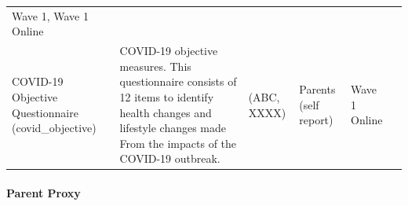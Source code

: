 \documentclass[]{book}
\let\oldparagraph\paragraph
\renewcommand{\paragraph}[1]{\oldparagraph{#1}\mbox{}}
\begin{document}
\begin{longtable}[]{@{}llllll@{}}
\begin{minipage}[t]{0.06\columnwidth}
Wave 1, Wave 1 Online\strut
\end{minipage} & \begin{minipage}[t]{0.10\columnwidth}\raggedright
\strut
\end{minipage}\tabularnewline
\begin{minipage}[t]{0.18\columnwidth}\raggedright
COVID-19 Objective Questionnaire (covid\_objective)\strut
\end{minipage} & \begin{minipage}[t]{0.18\columnwidth}\raggedright
COVID-19 objective measures. This questionnaire consists of 12 items to identify health changes and lifestyle changes made From the impacts of the COVID-19 outbreak.\strut
\end{minipage} & \begin{minipage}[t]{0.15\columnwidth}\raggedright
(ABC, XXXX)\strut
\end{minipage} & \begin{minipage}[t]{0.16\columnwidth}\raggedright
Parents (self report)\strut
\end{minipage} & \begin{minipage}[t]{0.06\columnwidth}\raggedright
Wave 1 Online\strut
\end{minipage} & \begin{minipage}[t]{0.10\columnwidth}\raggedright
\strut
\end{minipage}\tabularnewline
\bottomrule
\end{longtable}

\hypertarget{parent-proxy}{%
\paragraph{Parent Proxy}\label{parent-proxy}}
\end{document}
